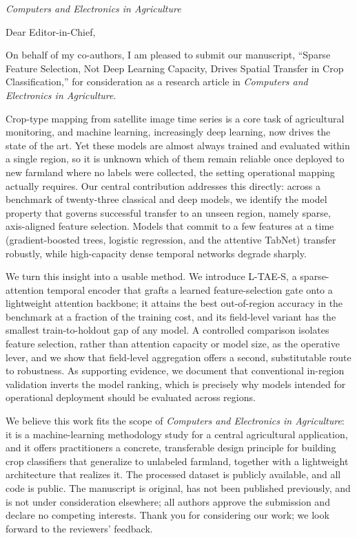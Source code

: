 \documentclass[11pt]{letter}
\begin{document}
\begin{letter}{\textit{Computers and Electronics in Agriculture}}

\opening{Dear Editor-in-Chief,}

On behalf of my co-authors, I am pleased to submit our manuscript, ``Sparse Feature Selection, Not Deep Learning Capacity, Drives Spatial Transfer in Crop Classification,'' for consideration as a research article in \textit{Computers and Electronics in Agriculture}.

Crop-type mapping from satellite image time series is a core task of agricultural monitoring, and machine learning, increasingly deep learning, now drives the state of the art. Yet these models are almost always trained and evaluated within a single region, so it is unknown which of them remain reliable once deployed to new farmland where no labels were collected, the setting operational mapping actually requires. Our central contribution addresses this directly: across a benchmark of twenty-three classical and deep models, we identify the model property that governs successful transfer to an unseen region, namely sparse, axis-aligned feature selection. Models that commit to a few features at a time (gradient-boosted trees, logistic regression, and the attentive TabNet) transfer robustly, while high-capacity dense temporal networks degrade sharply.

We turn this insight into a usable method. We introduce L-TAE-S, a sparse-attention temporal encoder that grafts a learned feature-selection gate onto a lightweight attention backbone; it attains the best out-of-region accuracy in the benchmark at a fraction of the training cost, and its field-level variant has the smallest train-to-holdout gap of any model. A controlled comparison isolates feature selection, rather than attention capacity or model size, as the operative lever, and we show that field-level aggregation offers a second, substitutable route to robustness. As supporting evidence, we document that conventional in-region validation inverts the model ranking, which is precisely why models intended for operational deployment should be evaluated across regions.

We believe this work fits the scope of \textit{Computers and Electronics in Agriculture}: it is a machine-learning methodology study for a central agricultural application, and it offers practitioners a concrete, transferable design principle for building crop classifiers that generalize to unlabeled farmland, together with a lightweight architecture that realizes it. The processed dataset is publicly available, and all code is public. The manuscript is original, has not been published previously, and is not under consideration elsewhere; all authors approve the submission and declare no competing interests. Thank you for considering our work; we look forward to the reviewers' feedback.


\end{letter}
\end{document}
